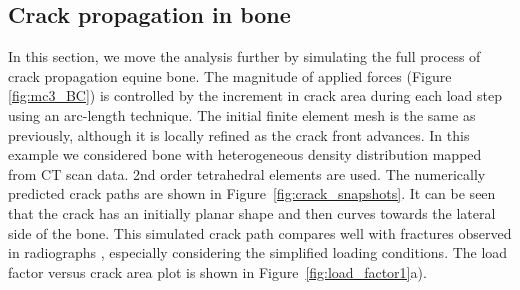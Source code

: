 \documentclass[onecolumn]{svjour3}
\begin{document}
\subsection{Crack propagation in bone}
In this section, we move the analysis further by simulating the full process of crack propagation equine bone. The magnitude of applied forces (Figure \ref{fig:mc3_BC}) is controlled by the increment in crack area during each load step using an arc-length technique. The initial finite element mesh is the same as previously, although it is locally refined as the crack front advances. In this example we considered bone with heterogeneous density distribution mapped from CT scan data. 2nd order tetrahedral elements are used.
The numerically predicted crack paths are shown in Figure~\ref{fig:crack_snapshots}. 
It can be seen that the crack has an initially planar shape and then curves towards the lateral side of the bone. This simulated crack path compares well with fractures observed in radiographs \cite{whitton2010third}, especially considering the simplified loading conditions. 
The load factor versus crack area plot is shown in Figure~\ref{fig:load_factor1}a). 
% 
\end{document}
